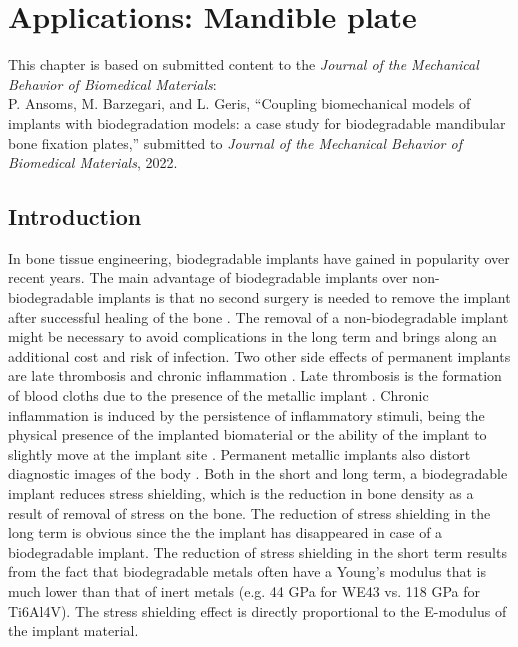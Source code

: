 \chapter{Applications: Mandible plate}\label{ch:mandible}

\begin{shaded}
This chapter is based on submitted content to the \textit{Journal of the Mechanical Behavior of Biomedical Materials}:\\
P. Ansoms, M. Barzegari, and L. Geris, ``Coupling biomechanical models of implants with biodegradation models: a case study for biodegradable mandibular bone fixation plates,'' submitted to \textit{Journal of the Mechanical Behavior of Biomedical Materials}, 2022.
\end{shaded}

\section{Introduction}

In bone tissue engineering, biodegradable implants have gained in popularity over recent years. The main advantage of biodegradable implants over non-biodegradable implants is that no second surgery is needed to remove the implant after successful healing of the bone \cite{Zheng2014}. The removal of a non-biodegradable implant might be necessary to avoid complications in the long term and brings along an additional cost and risk of infection. Two other side effects of permanent implants are late thrombosis and chronic inflammation \cite{KChen}. Late thrombosis is the formation of blood cloths due to the presence of the metallic implant \cite{thrombosis}. Chronic inflammation is induced by the persistence of inflammatory stimuli, being the physical presence of the implanted biomaterial or the ability of the implant to slightly move at the implant site \cite{inflammation}. Permanent metallic implants also distort diagnostic images of the body \cite{Han}. Both in the short and long term, a biodegradable implant reduces stress shielding, which is the reduction in bone density as a result of removal of stress on the bone. The reduction of stress shielding in the long term is obvious since the the implant has disappeared in case of a biodegradable implant. The reduction of stress shielding in the short term results from the fact that biodegradable metals often have a Young's modulus that is much lower than that of inert metals (e.g. 44 GPa for WE43 vs. 118 GPa for Ti6Al4V). The stress shielding effect is directly proportional to the E-modulus of the implant material.

